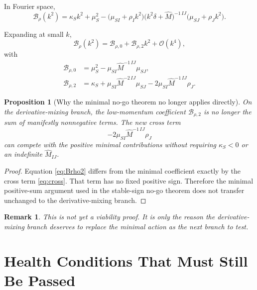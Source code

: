 \documentclass[11pt]{article}
\newtheorem{proposition}{Proposition}
\newtheorem{remark}{Remark}
\begin{document}
In Fourier space,
\begin{equation}
\mathcal B_{\rho}(k^2)
=
\kappa_Sk^2+\mu_S^2
-\bigl(\mu_{SI}+\rho_Ik^2\bigr)
\bigl(k^2\delta+\widehat M\bigr)^{-1\,IJ}
\bigl(\mu_{SJ}+\rho_Jk^2\bigr).
\label{eq:Brhok}
\end{equation}

Expanding at small \(k\),
\begin{equation}
\mathcal B_{\rho}(k^2)
=
\mathcal B_{\rho,0}
+\mathcal B_{\rho,2}k^2
+\mathcal O(k^4),
\label{eq:Brhoexpand}
\end{equation}
with
\begin{align}
\mathcal B_{\rho,0}
&=
\mu_S^2-\mu_{SI}\widehat M^{-1\,IJ}\mu_{SJ},
\label{eq:Brho0}
\\
\mathcal B_{\rho,2}
&=
\kappa_S
+\mu_{SI}\widehat M^{-2\,IJ}\mu_{SJ}
-2\mu_{SI}\widehat M^{-1\,IJ}\rho_J.
\label{eq:Brho2}
\end{align}

\begin{proposition}[Why the minimal no-go theorem no longer applies directly]
On the derivative-mixing branch, the low-momentum coefficient \(\mathcal B_{\rho,2}\) is no longer the sum of manifestly nonnegative terms. The new cross term
\begin{equation}
-2\mu_{SI}\widehat M^{-1\,IJ}\rho_J
\label{eq:cross}
\end{equation}
can compete with the positive minimal contributions without requiring \(\kappa_S<0\) or an indefinite \(\widehat M_{IJ}\).
\end{proposition}

\begin{proof}
Equation \eqref{eq:Brho2} differs from the minimal coefficient exactly by the cross term \eqref{eq:cross}. That term has no fixed positive sign. Therefore the minimal positive-sum argument used in the stable-sign no-go theorem does not transfer unchanged to the derivative-mixing branch.
\end{proof}

\begin{remark}
This is not yet a viability proof. It is only the reason the derivative-mixing branch deserves to replace the minimal action as the next branch to test.
\end{remark}

\section{Health Conditions That Must Still Be Passed}
\end{document}
